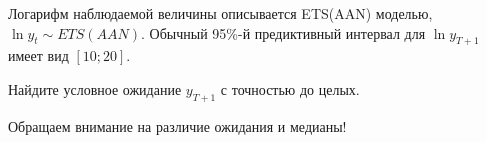 
\begin{question}
Логарифм наблюдаемой величины описывается ETS(AAN) моделью, \(\ln y_t \sim ETS(AAN)\).
Обычный 95\%-й предиктивный интервал для \(\ln y_{T+1}\) имеет вид \([10;20]\).

Найдите условное ожидание \(y_{T+1}\) с точностью до целых.
\end{question}

\begin{solution}
Обращаем внимание на различие ожидания и медианы!
\end{solution}

